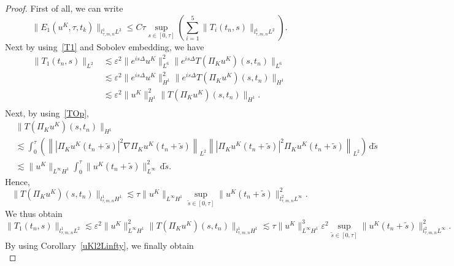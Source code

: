 \documentclass[10pt,a4paper]{article}
\begin{document}
  \begin{proof}
    First of all, we can write
    \begin{equation}\label{F1lplq}
      \|E_1(u^K, \tau, t_k)\|_{l^1_{\tau,m,n}L^2} \leq C \tau \sup_{s \in [0,\tau]}
      \left(\sum_{i=1}^5 \|T_i(t_n,s)\|_{l^1_{\tau,m,n}L^2} \right).
    \end{equation}
    Next by using~\eqref{T1} and Sobolev embedding, we have 
    \begin{equation}
      \begin{aligned}
        \|T_1(t_n,s)\|_{L^2} &\lesssim \varepsilon^2\|e^{is\Delta}u^K\|^2_{L^6} \|e^{is\Delta} T(\Pi_K u^K)(s,t_n)\|_{L^6} \\ 
        &\lesssim \varepsilon^2\|e^{is\Delta}u^K\|^2_{H^1} \|e^{is\Delta} T(\Pi_K u^K)(s,t_n)\|_{H^1} \\ 
        &\lesssim \varepsilon^2\|u^K\|^2_{H^1} \|T(\Pi_K u^K)(s,t_n)\|_{H^1} .\\ 
      \end{aligned}
    \end{equation}
    Next, by using~\eqref{TOp},
    \begin{equation}\label{TH1}
      \begin{aligned}
        & \|T(\Pi_K u^K)(s,t_n)\|_{H^1} \\ & \lesssim 
        \int_0^\tau \left( 
        \left\| |\Pi_K u^K(t_n+\tilde{s})|^2 \nabla\Pi_K u^K(t_n+\tilde{s}) \right\|_{L^2}
        \left\| |\Pi_K u^K(t_n+\tilde{s})|^2 \Pi_K u^K(t_n+\tilde{s}) \right\|_{L^2}
        \right)\,\mathrm{d}\tilde{s} \\ 
        & \lesssim \|u^K\|_{L^\infty H^1} \int_0^\tau
        \|u^K(t_n+\tilde{s})\|_{L^\infty}^2\,\mathrm{d}\tilde{s}.
      \end{aligned}
    \end{equation}
    Hence, 
    \begin{equation}\label{Tl1H1}
      \|T(\Pi_K u^K)(s,t_n)\|_{l^1_{\tau,m,n} H^1} \lesssim \tau \|u^K\|_{L^\infty H^1}
      \sup_{\tilde{s} \in [0,\tau]} \|u^K(t_n+\tilde{s})\|^2_{l^2_{\tau,m,n}L^\infty}.
    \end{equation}
    We thus obtain
    \[ \|T_1(t_n,s)\|_{l^1_{\tau,m,n}L^2} \lesssim \varepsilon^2\|u^K\|_{L^\infty H^1}^2 \|T(\Pi_K u^K)(s,t_n)\|_{l^1_{\tau,m,n} H^1}
    \lesssim \tau \|u^K\|_{L^\infty H^1}^3 \varepsilon^2\sup_{\tilde{s} \in [0,\tau]} 
    \|u^K(t_n+\tilde{s})\|^2_{l^2_{\tau,m,n}L^\infty} .\]
    By using Corollary~\ref{uKl2Linfty}, we finally obtain 
    \begin{equation}\label{T1l1L2}

\end{equation}
\end{proof}
\end{document}
